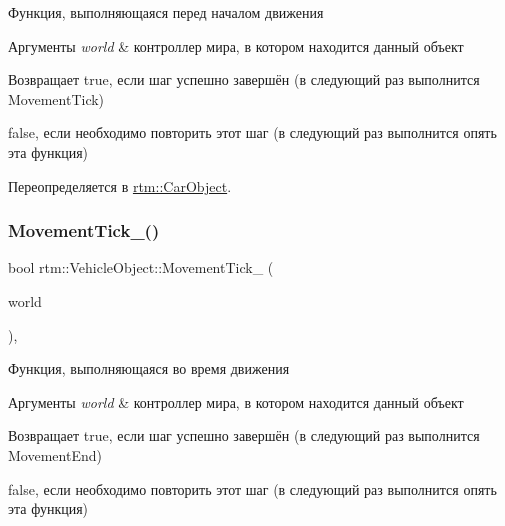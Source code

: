 Функция, выполняющаяся перед началом движения 


\begin{DoxyParams}{Аргументы}
{\em world} & контроллер мира, в котором находится данный объект \\
\hline
\end{DoxyParams}
\begin{DoxyReturn}{Возвращает}
true, если шаг успешно завершён (в следующий раз выполнится Movement\+Tick) 

false, если необходимо повторить этот шаг (в следующий раз выполнится опять эта функция) 
\end{DoxyReturn}


Переопределяется в \hyperlink{classrtm_1_1_car_object_abbedfee1e8db8b12ea912d77efc4805c}{rtm\+::\+Car\+Object}.

\mbox{\label{classrtm_1_1_vehicle_object_a06a920b3fe0df4fa4ca0687a9366426a}} 
\subsubsection{\texorpdfstring{Movement\+Tick\+\_\+()}{MovementTick\_()}}
{\footnotesize\ttfamily bool rtm\+::\+Vehicle\+Object\+::\+Movement\+Tick\+\_\+ (\begin{DoxyParamCaption}\item[{\hyperlink{classrtm_1_1_world_controller}{World\+Controller} $\ast$const}]{world }\end{DoxyParamCaption})\hspace{0.3cm}{\ttfamily [protected]}, {\ttfamily [virtual]}}



Функция, выполняющаяся во время движения 


\begin{DoxyParams}{Аргументы}
{\em world} & контроллер мира, в котором находится данный объект \\
\hline
\end{DoxyParams}
\begin{DoxyReturn}{Возвращает}
true, если шаг успешно завершён (в следующий раз выполнится Movement\+End) 

false, если необходимо повторить этот шаг (в следующий раз выполнится опять эта функция) 
\end{DoxyReturn}


